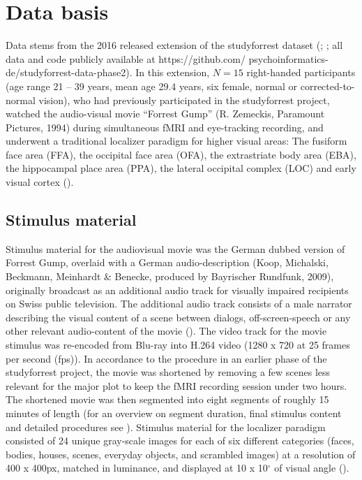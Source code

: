 \documentclass[a4paper, 12pt]{scrreprt}
\begin{document}
\section{Data basis}

Data stems from the 2016 released extension of the studyforrest dataset (\cite{hanke2016studyforrest}; \cite{sengupta2016studyforrest}; all data and code publicly available at https://github.com/ psychoinformatics-de/studyforrest-data-phase2). In this extension, $N = 15$ right-handed participants (age range 21 – 39 years, mean age 29.4 years, six female, normal or corrected-to-normal vision), who had previously participated in the studyforrest project, watched the audio-visual movie “Forrest Gump” (R. Zemeckis, Paramount Pictures, 1994) during simultaneous fMRI and eye-tracking recording, and underwent a traditional localizer paradigm for higher visual areas: The fusiform face area (FFA), the occipital face area (OFA), the extrastriate body area (EBA), the hippocampal place area (PPA), the lateral occipital complex (LOC) and early visual cortex (\cite{sengupta2016studyforrest}).

\subsection{Stimulus material}

Stimulus material for the audiovisual movie was the German dubbed version of Forrest Gump, overlaid with a German audio-description (Koop, Michalski, Beckmann, Meinhardt \& Benecke, produced by Bayrischer Rundfunk, 2009), originally broadcast as an additional audio track for visually impaired recipients on Swiss public television. The additional audio track consists of a male narrator describing the visual content of a scene between dialogs, off-screen-speech or any other relevant audio-content of the movie (\cite{hanke2014high}). The video track for the movie stimulus was re-encoded from Blu-ray into H.264 video (1280 x 720 at 25 frames per second (fps)). In accordance to the procedure in an earlier phase of the studyforrest project, the movie was shortened by removing a few scenes less relevant for the major plot to keep the fMRI recording session under two hours. The shortened movie was then segmented into eight segments of roughly 15 minutes of length (for an overview on segment duration, final stimulus content and detailed procedures see \textcite{hanke2014high}). Stimulus material for the localizer paradigm consisted of 24 unique gray-scale images for each of six different categories (faces, bodies, houses, scenes, everyday objects, and scrambled images) at a resolution of 400 x 400px, matched in luminance, and displayed at 10 x 10$^\circ$ of visual angle (\cite{sengupta2016studyforrest}).
\end{document}
